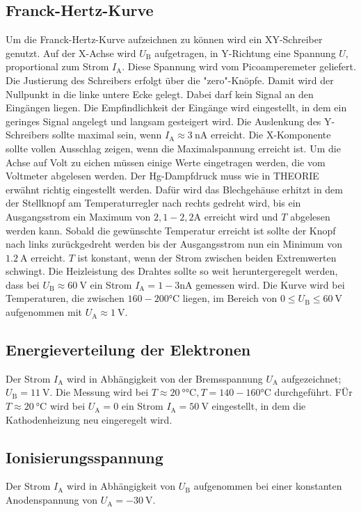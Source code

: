 \subsection{Franck-Hertz-Kurve}
Um die Franck-Hertz-Kurve aufzeichnen zu können wird ein XY-Schreiber genutzt. 
Auf der X-Achse wird $U_\mathup{B}$ aufgetragen, in Y-Richtung eine Spannung $U$, proportional zum Strom $I_\mathup{A}$. 
Diese Spannung wird vom Picoamperemeter geliefert.
Die Justierung des Schreibers erfolgt über die "zero"-Knöpfe. Damit wird der Nullpunkt in die linke untere Ecke gelegt.
Dabei darf kein Signal an den Eingängen liegen. 
Die Empfindlichkeit der Eingänge wird eingestellt, in dem ein geringes Signal angelegt und langsam gesteigert wird. 
Die Auslenkung des Y-Schreibers sollte maximal sein, wenn $I_\mathup{A}\approx \SI{3}{\nano\ampere}$ erreicht.
 Die X-Komponente sollte vollen Ausschlag zeigen, wenn die Maximalspannung erreicht ist.
 Um die Achse auf Volt zu eichen müssen einige Werte eingetragen werden, die vom Voltmeter abgelesen werden.
Der Hg-Dampfdruck muss wie in THEORIE erwähnt richtig eingestellt werden. 
Dafür wird das Blechgehäuse erhitzt in dem der Stellknopf am Temperaturregler nach rechts gedreht wird, bis ein Ausgangsstrom ein Maximum von ${2,1-2,2}{\si\ampere}$ erreicht wird und $T$ abgelesen werden kann. 
Sobald die gewünschte Temperatur erreicht ist sollte der Knopf  nach links zurückgedreht werden bis der Ausgangsstrom nun ein Minimum von $\SI{1,2}{\ampere}$ erreicht. 
$T$ ist konstant, wenn der Strom zwischen beiden Extremwerten schwingt.
Die Heizleistung des Drahtes sollte so weit heruntergeregelt werden, dass bei $U_\mathup{B}\approx \SI{60}{\volt}$ ein Strom $I_\mathup{A}={1-3}{\si{\nano\ampere}}$ gemessen wird. 
Die Kurve wird bei Temperaturen, die zwischen ${160-200}\si{\celsius}$ liegen, im Bereich von $0\leq U_\mathup{B} \leq \SI{60}{\volt}$ aufgenommen mit $U_\mathup{A}\approx \SI{1}{\volt}$.
\subsection{Energieverteilung der Elektronen}
Der Strom $I_\mathup{A}$ wird in Abhängigkeit von der Bremsspannung $U_\mathup{A}$ aufgezeichnet; $U_\mathup{B}=\SI{11}{\volt}$. 
Die Messung wird bei $T\approx \SI{20}{\degree\celsius},T={140-160}{\si\celsius}$ durchgeführt.
FÜr $T\approx \SI{20}{\celsius}$ wird bei $U_\mathup{A}=0$ ein Strom $I_\mathup{A}=\SI{50}{\volt}$ eingestellt, in dem die Kathodenheizung neu eingeregelt wird.
\subsection{Ionisierungsspannung}
Der Strom $I_\mathup{A}$ wird in Abhängigkeit von $U_\mathup{B}$ aufgenommen bei einer konstanten Anodenspannung von $U_\mathup{A}=\SI{-30}{\volt}$.
